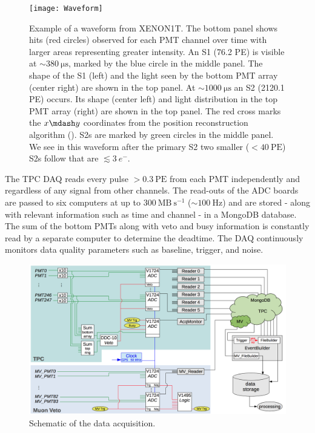 \begin{figure}
\centering
\texttt{[image: Waveform]}
\caption{Example of a waveform from XENON1T.  The bottom panel shows hits (red circles) observed for each PMT channel over time with
larger areas representing greater intensity.  An S1 (76.2 PE) is visible at ${\sim}380\ \mathrm{\mu s}$, marked by the blue circle in the
middle panel.  The shape of the S1 (left) and the light seen by the bottom PMT array (center right) are shown in the top panel.  At
${\sim} 1000\ \mathrm{\mu s}$ an S2 (2120.1 PE) occurs.  Its shape (center left) and light distribution in the top PMT array (right) are
shown in the top panel.  The red cross marks the $x \mdash y$ coordinates from the position reconstruction algorithm
().  S2s are marked by
green circles in the middle panel.  We see in this waveform after the primary S2 two smaller ($< 40\ \mathrm{PE}$) S2s follow that are
$\lesssim 3\ e^-$.}
\label{fig:xenon1t_waveform}
\end{figure}

The TPC DAQ reads every pulse $> 0.3\ \mathrm{PE}$ from each PMT independently and regardless of any signal from other
channels.  The read-outs of the ADC boards are passed to six computers at up to $300\ \mathrm{MB\ s^{-1}}$ (${\sim}100\ \mathrm{Hz}$) and
are stored - along with relevant information such as time and channel - in a MongoDB database.  The sum of the bottom PMTs along with veto
and busy information is constantly read by a separate computer to determine the deadtime.  The DAQ continuously monitors data quality
parameters such as baseline, trigger, and noise.

\begin{figure}
\centering
\includegraphics[width=\textwidth]{DAQ}
\caption{Schematic of the data acquisition.}
\label{fig:xenon1t_daq_schematic}
\end{figure}

